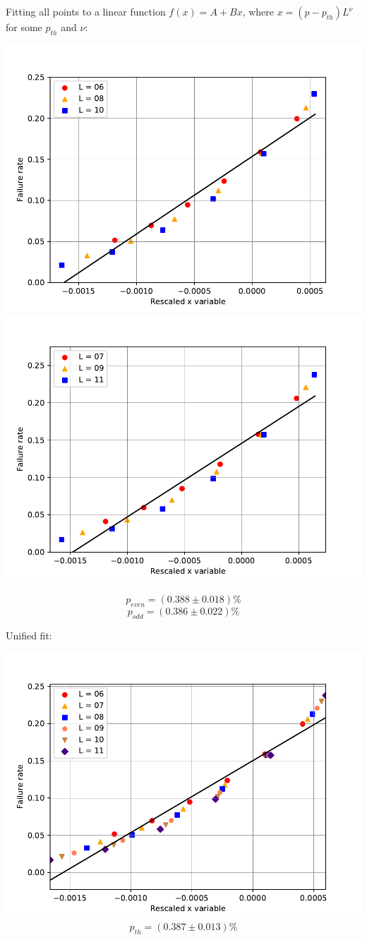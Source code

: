 \documentclass[pra]{revtex4-1}
\begin{document}
\noindent Fitting all points to a linear function $f(x) = A + Bx$, where $x=(p-p_{th})L^{\nu}$ for some $p_{th}$ and $\nu$: 
  
\includegraphics[width=.49\textwidth]{../graphs-paper2/mgc-dephasing-even-rescaled.pdf}
\includegraphics[width=.49\textwidth]{../graphs-paper2/mgc-dephasing-odd-rescaled.pdf}

\[  p_{even} = (0.388 \pm 0.018)\% \]
\[  p_{odd} = (0.386 \pm 0.022)\% \]
\clearpage 

Unified fit: \begin{center} 

\includegraphics[width=.9\textwidth]{../graphs-paper2/mgc-dephasing-rescaled.pdf}
\[  p_{th} = (0.387 \pm 0.013)\% \] \end{center}
\clearpage 
\end{document}
